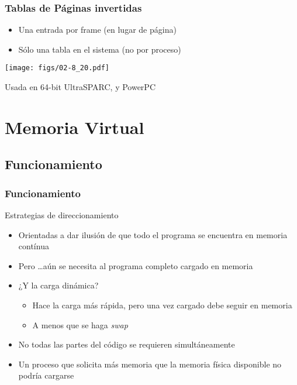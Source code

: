 \documentclass[letter]{beamer}
\begin{document}
\begin{frame}
  \frametitle{Tablas de Páginas invertidas}

  \begin{itemize}
    \item Una entrada por frame (en lugar de página)
    \item Sólo una tabla en el sistema (no por proceso)
  \end{itemize}

  \begin{center}
    \texttt{[image: figs/02-8\_20.pdf]}
  \end{center}

  Usada en 64-bit UltraSPARC, y PowerPC

\end{frame}
\section{Memoria Virtual}

\subsection{Funcionamiento}

\begin{frame}
  \frametitle{Funcionamiento}

  Estrategias de direccionamiento
  
  \begin{itemize}
    \item Orientadas a dar ilusión de que todo el programa se encuentra en memoria contínua
    \item Pero \ldots aún se necesita al programa completo cargado en memoria
    \item ¿Y la carga dinámica?
      \begin{itemize}
        \item Hace la carga más rápida, pero una vez cargado debe seguir en memoria
        \item A menos que se haga {\em swap}
      \end{itemize}
  \end{itemize}

  \begin{itemize}
    \item<3-> No todas las partes del código se requieren simultáneamente
    \item<3-> Un proceso que solicita más memoria que la memoria física disponible no podría cargarse
  \end{itemize}
\end{frame}
\end{document}
